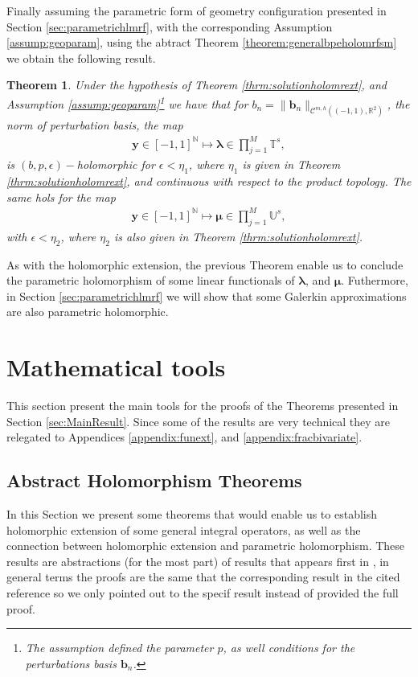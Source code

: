 \documentclass{article}
\newtheorem{theorem}{Theorem}[section]
\newcommand{\bmu} {\bm{\mu}}
\newcommand{\IN}{{\mathbb N}}
\newcommand{\IR}{{\mathbb R}}
\newcommand{\IU}{{\mathbb U}}
\newcommand{\IT}{{\mathbb T}}
\newcommand{\cmspaceh}[4]{\mathcal{C}^{#1,#2} \left( #3, #4 \right)}
\newcommand{\bla}{\boldsymbol \lambda}
\newcommand{\by}{\bm{y}}
\begin{document}
Finally assuming the parametric form of geometry configuration presented in Section \ref{sec:parametrichlmrf}, with the corresponding Assumption \ref{assump:geoparam}, using the abtract  Theorem \ref{theorem:generalbpeholomrfsm} we obtain the following result. 

\begin{theorem}
\label{thrm:bpeholomr}
Under the hypothesis of Theorem \ref{thrm:solutionholomrext}, and Assumption \ref{assump:geoparam}\footnote{The assumption defined the parameter $p$, as well conditions for the perturbations basis $\mathbf{b}_n$.} we have that for $b_n = \|\mathbf{b}_n\|_{\cmspaceh{m}{h}{(-1,1)}{\IR^2}}$, the norm of perturbation basis, the map
\begin{align*}
\by \in [-1,1]^{\IN} \mapsto \bla \in \prod_{j=1}^M \IT^s,
\end{align*}
is $(b,p,\epsilon)-$holomorphic for $\epsilon < \eta_1$, where $\eta_1$ is given in Theorem \ref{thrm:solutionholomrext}, and continuous with respect to the product topology. The same hols for the map 
\begin{align*}
\by \in [-1,1]^{\IN} \mapsto \bmu \in \prod_{j=1}^M \IU^s,
\end{align*}
with $\epsilon < \eta_2$, where $\eta_2$ is also given in Theorem \ref{thrm:solutionholomrext}.
\end{theorem}
As with the holomorphic extension, the previous Theorem enable us to conclude the parametric holomorphism of some linear functionals of $\bla$, and $\bmu$. Futhermore, in Section \ref{sec:parametrichlmrf} we will  show that some Galerkin approximations are also parametric holomorphic. 
\section{Mathematical tools}
\label{sec:mathtools}
This section present the main tools for the proofs of the Theorems presented in Section \ref{sec:MainResult}. Since some of the results are very technical they are relegated to Appendices \ref{appendix:funext}, and \ref{appendix:fracbivariate}.

\subsection{Abstract Holomorphism Theorems}
\label{sec:abstracthlmrf}

In this Section we present some theorems that would enable us to establish holomorphic extension of some general integral operators, as well as the connection between holomorphic extension and parametric holomorphism. These results are abstractions (for the most part) of results that appears first in \cite{Henriquez2021}, in general terms the proofs are the same that the corresponding result in the cited reference so we only pointed out to the specif result instead of provided the full proof. 
\end{document}
